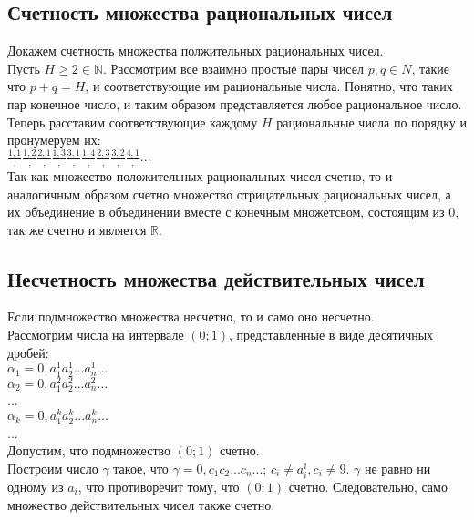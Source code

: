 \documentclass{article}
\begin{document}
        
    \subsection*{Счетность множества рациональных чисел}
        Докажем счетность множества полжительных рациональных чисел.
        \\ 
        Пусть $H \ge 2 \in \mathbb{N}$. Рассмотрим все взаимно простые пары чисел $p, q \in {N}$, такие что $p + q = H$, и соответствующие им рациональные числа.
        Понятно, что таких пар конечное число, и таким образом представляется любое рациональное число.
        \\
        Теперь расставим соответствующие каждому $H$ рациональные числа по порядку и пронумеруем их:
        \\
        $\frac{1, 1}, \frac{1, 2}, \frac{2, 1}, \frac{1, 3}, \frac{3, 1}, \frac{1, 4}, \frac{2, 3}, \frac{3, 2}, \frac{4, 1}, ...$
        \\
        Так как множество положительных рациональных чисел счетно, то и аналогичным образом счетно множество отрицательных рациональных чисел,
        а их объединение в объединении вместе с конечным множетсвом, состоящим из $0$, так же счетно и является $\mathbb{R}$.
        
    \subsection*{Несчетность множества действительных чисел}
        Если подмножество множества несчетно, то и само оно несчетно.
        \\
        Рассмотрим числа на интервале $(0;1)$, представленные в виде десятичных дробей:
        \\
        $\alpha_1 = 0,a_1^1a_2^1...a_n^1...$
        \\
        $\alpha_2 = 0,a_1^2a_2^2...a_n^2...$
        \\
        ...
        \\
        $\alpha_k = 0,a_1^ka_2^k...a_n^k...$
        \\
        ...
        \\
        Допустим, что подмножество $(0;1)$ счетно.
        \\
        Построим число $\gamma$ такое, что $\gamma = 0,c_1c_2...c_n...$; $c_i \neq a_i^i, c_i \neq 9$. $\gamma$ не равно ни одному из $a_i$,
        что противоречит тому, что $(0;1)$ счетно. Следовательно, само множество действительных чисел также счетно.
        
    \newpage

    \section{}
    \newpage
\end{document}
